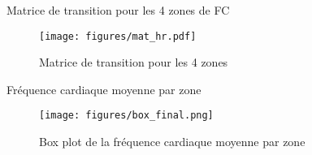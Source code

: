 \documentclass{beamer}
\begin{document}
\begin{frame}{Matrice de transition pour les 4 zones de FC}
    \begin{figure}
        \centering
        \texttt{[image: figures/mat\_hr.pdf]}
        \caption{Matrice de transition pour les 4 zones}
    \end{figure}
\end{frame}

\begin{frame}{Fréquence cardiaque moyenne par zone}
    \begin{figure}
        \centering
        \texttt{[image: figures/box\_final.png]}
        \caption{Box plot de la fréquence cardiaque moyenne par zone}
    \end{figure}
\end{frame}
\end{document}
